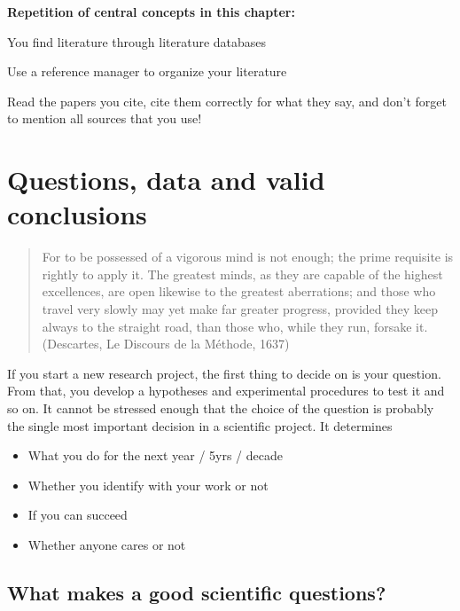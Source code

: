 \documentclass{tufte-book}
\begin{document}
\vspace{1cm}
\begin{mdframed}
    
\textbf{Repetition of central concepts in this chapter:} 

\begin{itemize*}
  \item You find literature through literature databases
  \item Use a reference manager to organize your literature
  \item Read the papers you cite, cite them correctly for what they say, and don't forget to mention all sources that you use!
\end{itemize*}

\end{mdframed}


\chapter{Questions, data and valid conclusions}

\begin{quote}
For to be possessed of a vigorous mind is not enough; the prime requisite is rightly to apply it. The greatest minds, as they are capable of the highest excellences, are open likewise to the greatest aberrations; and those who travel very slowly may yet make far greater progress, provided they keep always to the straight road, than those who, while they run, forsake it. (Descartes, Le Discours de la Méthode, 1637) 
\end{quote}


If you start a new research project, the first thing to decide on is your question. From that, you develop a hypotheses and experimental procedures to test it and so on. It cannot be stressed enough that the choice of the question is probably the single most important decision in a scientific project. It determines 

\begin{itemize}
\item What you do for the next year / 5yrs / decade
\item Whether you identify with your work or not
\item If you can succeed
\item Whether anyone cares or not
\end{itemize}


\section{What makes a good scientific questions?}
\end{document}
